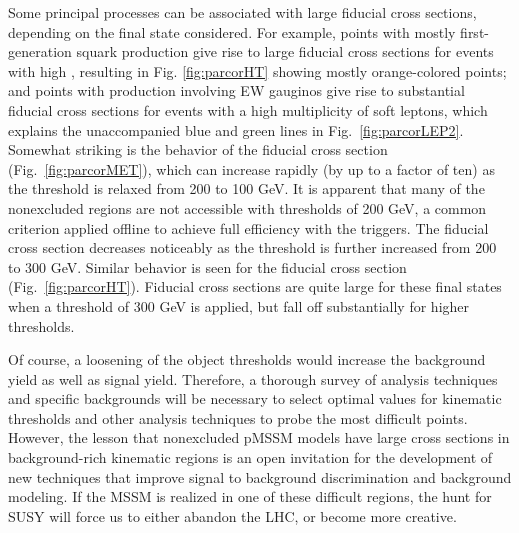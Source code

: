 Some principal processes can be associated with large fiducial
cross sections, depending on the final state considered. For example, points with mostly
first-generation squark production give rise to large
fiducial cross sections for events with high \HT{}, resulting in Fig.
\ref{fig:parcorHT} showing mostly orange-colored points; and points with production involving EW gauginos give rise to substantial
fiducial cross sections for events with a high multiplicity of soft leptons, which
explains the unaccompanied blue and green lines in Fig.~\ref{fig:parcorLEP2}.  Somewhat striking is the behavior of the \MET{} fiducial cross section
(Fig.~\ref{fig:parcorMET}), which can increase rapidly (by up to a
factor of ten) as the threshold
is relaxed from 200 to 100 GeV. It is apparent that many of the
nonexcluded regions are not accessible with thresholds of 200 GeV, 
a common criterion applied offline to achieve full efficiency
with the triggers. The fiducial cross section decreases noticeably as the
threshold is further increased from 200 to 300 GeV. Similar behavior is seen for the \HT{} fiducial cross section
(Fig.~\ref{fig:parcorHT}). Fiducial cross
sections are quite large for these final states when a
threshold of 300 GeV is applied, but fall off substantially for higher
thresholds. 

Of course, a loosening of the object thresholds would increase the background yield as well as signal yield. Therefore, a thorough survey of analysis techniques and specific backgrounds will be necessary 
to select optimal values for kinematic thresholds and other analysis techniques to probe the most difficult points. However, the lesson that nonexcluded pMSSM models have large cross sections in background-rich kinematic regions is an open invitation for the development of new techniques that improve signal to background discrimination and background modeling. If the MSSM is realized in one of these difficult regions, the hunt for SUSY will force us to either abandon the LHC, or become more creative. 

\FloatBarrier
